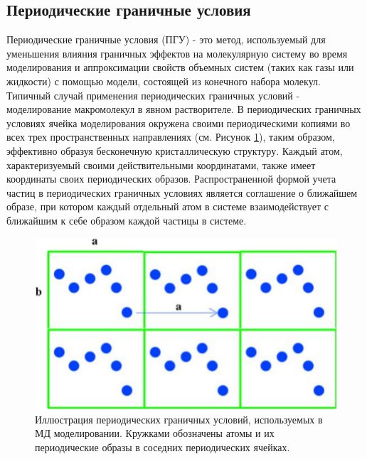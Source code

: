 \subsection{Периодические граничные условия}

Периодические граничные условия (ПГУ) - это метод, используемый для уменьшения влияния граничных эффектов на молекулярную систему во время моделирования и аппроксимации свойств объемных систем (таких как газы или жидкости) с помощью модели, состоящей из конечного набора молекул. Типичный случай применения периодических граничных условий - моделирование макромолекул в явном растворителе.
    В периодических граничных условиях ячейка моделирования окружена своими периодическими копиями во всех трех пространственных направлениях (см. Рисунок \ref{fig:p1_1:f11}), таким образом, эффективно образуя бесконечную кристаллическую структуру. Каждый атом, характеризуемый своими действительными координатами, также имеет координаты своих периодических образов. Распространенной формой учета частиц в периодических граничных условиях является соглашение о ближайшем образе, при котором каждый отдельный атом в системе взаимодействует с ближайшим к себе образом каждой частицы в системе.

\begin{figure} [h!]
    \centering
    \includegraphics [width=\textwidth]{images/p1/part1_1_md/part1_1_md_f11.pdf}
    \caption[Иллюстрация периодических граничных условий]{Иллюстрация периодических граничных условий, используемых в МД моделировании. Кружками обозначены атомы и их периодические образы в соседних периодических ячейках.}
    \label{fig:p1_1:f11}
\end{figure}

